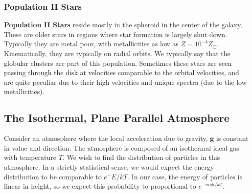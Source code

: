 \documentclass[10pt]{article}
\begin{document}
	\subsubsection{Population II Stars}
	 \textbf{Population II Stars} reside mostly in the spheroid in the center of the galaxy. These are older stars in regions where star formation is largely shut down. Typically they are metal poor, with metallicities as low as $Z=10^{-4}Z_\odot$. Kinematically, they are typically on radial orbits. We typically say that the globular clusters are part of this population. Sometimes these stars are seen passing through the disk at velocities comparable to the orbital velocities, and are quite peculiar due to their high velocities and unique spectra (due to the low metallicities).
	 
	 \subsection{The Isothermal, Plane Parallel Atmosphere}
	 Consider an atmosphere where the local acceleration due to gravity, $\mathbf{g}$ is constant in value and direction. The atmosphere is composed of an isothermal ideal gas with temperature $T$. We wish to find the distribution of particles in this atmosphere. In a strictly statistical sense, we would expect the energy distribution to be comparable to $e^-{E/kT}$. In our case, the energy of particles is linear in height, so we expect this probability to proportional to $e^{-mgh/kT}$.\\
	 
\end{document}
